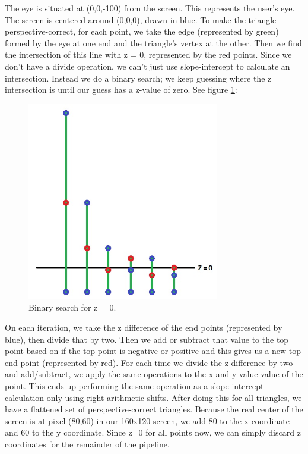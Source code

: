 \documentclass[onecolumn]{IEEEtran}
\begin{document}
The eye is situated at (0,0,-100) from the screen.  This represents the user’s eye.  The screen is centered around (0,0,0), drawn in blue.  To make the triangle perspective-correct, for each point, we take the edge (represented by green) formed by the eye at one end and the triangle’s vertex at the other.  Then we find the intersection of this line with z = 0, represented by the red points.  Since we don’t have a divide operation, we can’t just use slope-intercept to calculate an intersection.  Instead we do a binary search; we keep guessing where the z intersection is until our guess has a z-value of zero.  See figure \ref{fig:binarySearch}:

\begin{figure}[H]
	\centering
	\includegraphics[width=0.75\textwidth]{binarySearch.png}
	\caption{Binary search for z = 0.}
	\label{fig:binarySearch}
\end{figure}

On each iteration, we take the z difference of the end points (represented by blue), then divide that by two.  Then we add or subtract that value to the top point based on if the top point is negative or positive and this gives us a new top end point (represented by red).  For each time we divide the z difference by two and add/subtract, we apply the same operations to the x and y value value of the point.  This ends up performing the same operation as a slope-intercept calculation only using right arithmetic shifts.  After doing this for all triangles, we have a flattened set of perspective-correct triangles.  Because the real center of the screen is at pixel (80,60) in our 160x120 screen, we add 80 to the x coordinate and 60 to the y coordinate.  Since z=0 for all points now, we can simply discard z coordinates for the remainder of the pipeline.
\end{document}

